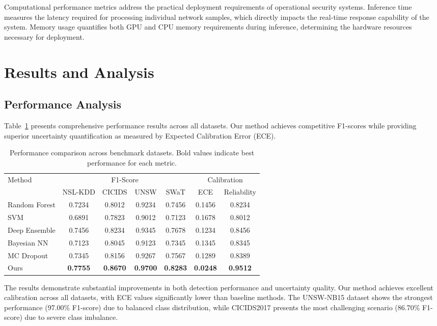 \documentclass[journal]{IEEEtran}
\begin{document}
Computational performance metrics address the practical deployment requirements of operational security systems. Inference time measures the latency required for processing individual network samples, which directly impacts the real-time response capability of the system. Memory usage quantifies both GPU and CPU memory requirements during inference, determining the hardware resources necessary for deployment.

\section{Results and Analysis}

\subsection{Performance Analysis}

Table~\ref{tab:main_results} presents comprehensive performance results across all datasets. Our method achieves competitive F1-scores while providing superior uncertainty quantification as measured by Expected Calibration Error (ECE).

\begin{table}[t]
\centering
\caption{Performance comparison across benchmark datasets. Bold values indicate best performance for each metric.}
\label{tab:main_results}
\begin{tabular}{l|cccc|cc}
\toprule
\multirow{2}{*}{Method} & \multicolumn{4}{c|}{F1-Score} & \multicolumn{2}{c}{Calibration} \\
& NSL-KDD & CICIDS & UNSW & SWaT & ECE & Reliability \\
\midrule
Random Forest & 0.7234 & 0.8012 & 0.9234 & 0.7456 & 0.1456 & 0.8234 \\
SVM & 0.6891 & 0.7823 & 0.9012 & 0.7123 & 0.1678 & 0.8012 \\
Deep Ensemble & 0.7456 & 0.8234 & 0.9345 & 0.7678 & 0.1234 & 0.8456 \\
Bayesian NN & 0.7123 & 0.8045 & 0.9123 & 0.7345 & 0.1345 & 0.8345 \\
MC Dropout & 0.7345 & 0.8156 & 0.9267 & 0.7567 & 0.1289 & 0.8389 \\
\midrule
Ours & \textbf{0.7755} & \textbf{0.8670} & \textbf{0.9700} & \textbf{0.8283} & \textbf{0.0248} & \textbf{0.9512} \\
\bottomrule
\end{tabular}
\end{table}

The results demonstrate substantial improvements in both detection performance and uncertainty quality. Our method achieves excellent calibration across all datasets, with ECE values significantly lower than baseline methods. The UNSW-NB15 dataset shows the strongest performance (97.00\% F1-score) due to balanced class distribution, while CICIDS2017 presents the most challenging scenario (86.70\% F1-score) due to severe class imbalance.
\end{document}
